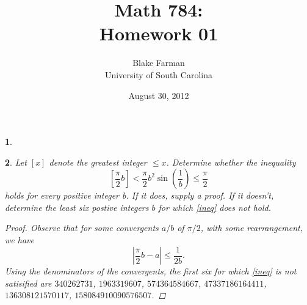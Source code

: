 \documentclass[10pt]{amsart}
\author{Blake Farman\\University of South Carolina}
\title{Math 784:\\Homework 01}
\date{August 30, 2012}
\newcommand{\abs}[1]{\left| #1 \right|}
\begin{document}
\maketitle

\newtheorem{thm}{}

\begin{thm}
	
\end{thm}

\begin{thm}
Let $[x]$ denote the greatest integer $\leq x$. Determine whether the inequality
	\begin{equation}\label{ineq}
		\left[\frac{\pi}{2}b\right] < \frac{\pi}{2}b^2\sin\left(\frac{1}{b}\right) \leq \frac{\pi}{2}
	\end{equation}
holds for every positive integer b. If it does, supply a proof. If it doesn't, determine the
least six postive integers $b$ for which \eqref{ineq} does not hold.
	\begin{proof}
		Observe that for some convergents $a/b$ of $\pi/2$, with some rearrangement, we have
		$$\abs{\frac{\pi}{2}b - a} \leq \frac{1}{2b}.$$
		Using the denominators of the convergents, the first six for which \eqref{ineq} is not satisified are
		$340262731$, $1963319607$, $574364584667$, $47337186164411$, $136308121570117$, $158084910090576507$.
	\end{proof}
\end{thm}
\end{document}
